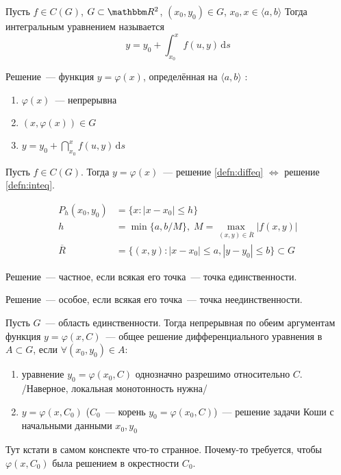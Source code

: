\documentclass[10pt]{../notes}
\begin{document}
\begin{defn}\label{defn:inteq}
  Пусть $f\in C(G)$, $G\subset\R^2$, $(x_0, y_0) \in G$, $x_0, x\in \langle a, b \rangle$
  Тогда интегральным уравнением называется 
  \[
    y = y_0 + \int_{x_0}^{x} f(u, y)\, \mathrm d s
  \]
\end{defn}

\begin{defn}\label{defn:intsol}
  Решение~--- функция $y=\varphi(x)$, определённая на $\langle a, b \rangle$ :
  \begin{enumerate}
    \item $\varphi(x)$~--- непрерывна
    \item $(x, \varphi(x)) \in G$
    \item $ y = y_0 + \dint_{x_0}^{x} f(u, y)\, \mathrm d s $
  \end{enumerate}
\end{defn}

\begin{thrm}\label{thrm:diffinteqconnect}
  Пусть $f\in C(G)$. Тогда $y=\varphi(x)$~--- решение \ref{defn:diffeq} $\Leftrightarrow$ решение \ref{defn:inteq}.
\end{thrm}

\begin{defn}\label{defn:peanosegm}
  \begin{align*}
    P_h(x_0, y_0) &= \{x\colon |x-x_0| \leqslant h\} \\
    h &= \min \{a, b/M\},\; M = \max_{(x, y)\in \overline R} | f(x, y) | \\
    \overline R &= \{ (x, y) \colon |x-x_0| \leqslant a, | y-y_0| \leqslant b\} \subset G
  \end{align*}
\end{defn}

\begin{defn}\label{defn:partsol}
  Решение~--- частное, если всякая его точка~--- точка единственности.
\end{defn}

\begin{defn}\label{defn:singsol}
  Решение~--- особое, если всякая его точка~--- точка неединственности.
\end{defn}

\begin{defn}\label{defn:generalsol}
  Пусть $G$~--- область единственности. Тогда непрерывная по обеим аргументам функция $y = \varphi(x,C)$~--- общее решение 
  дифференциального уравнения в $A \subset G$, если $\forall (x_0, y_0) \in A $:
  \begin{enumerate}
    \item  уравнение $y_0 = \varphi(x_0, C)$ однозначно разрешимо относительно $C$. \\
      /Наверное, локальная монотонность нужна/
    \item $y=\varphi(x, C_0)$ ($C_0$~--- корень $y_0=\varphi(x_0, C)$)~--- решение задачи Коши с начальными данными $x_0, y_0$
  \end{enumerate}
  Тут кстати в самом конспекте что-то странное. Почему-то требуется, чтобы $\varphi(x,C_0)$ была решением в окрестности $C_0$.
\end{defn}
\end{document}
